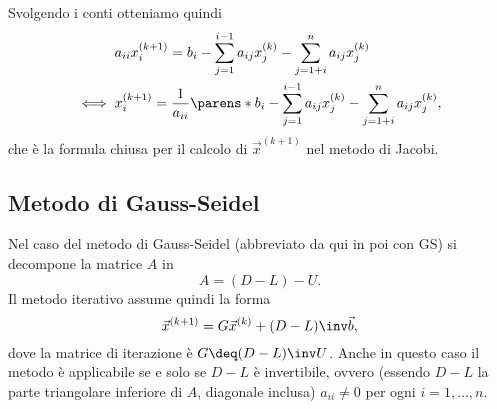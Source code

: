 Svolgendo i conti otteniamo quindi \begin{align*}
    &a_{ii}x^{(k+1)}_i = b_i - \sum_{j=1}^{i-1} a_{ij}x^{(k)}_j - \sum_{j=1+i}^n a_{ij}x^{(k)}_j\\
    \iff {}&x^{(k+1)}_i = \frac{1}{a_{ii}} \parens*{b_i - \sum_{j=1}^{i-1} a_{ij}x^{(k)}_j - \sum_{j=1+i}^n a_{ij}x^{(k)}_j},
\end{align*} che è la formula chiusa per il calcolo di $\vec x^{(k+1)}$ nel metodo di Jacobi.

\subsection{Metodo di Gauss-Seidel}
Nel caso del metodo di Gauss-Seidel (abbreviato da qui in poi con GS) si decompone la matrice $A$ in \[
    A = (D - L) - U.
\] Il metodo iterativo assume quindi la forma \[
    \vec x^{(k+1)} = G\vec x^{(k)} + (D - L)\inv\vec b,
\] dove la matrice di iterazione è $G \deq (D-L)\inv U$. Anche in questo caso il metodo è applicabile se e solo se $D-L$ è invertibile, ovvero (essendo $D-L$ la parte triangolare inferiore di $A$, diagonale inclusa) $a_{ii} \neq 0$ per ogni $i = 1, \dots, n$.


